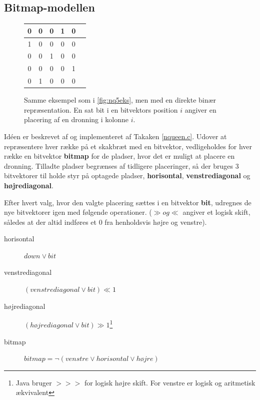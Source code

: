 \documentclass[draft,a4paper,11pt]{article}
\begin{document}

\subsection{Bitmap-modellen}\label{bitmapmodellen}

\begin{figure}[!h]
\begin{center}
\begin{tabular}{|c|c|c|c|c|c}
\hline	0 & 0 & 0 & 1 & 0 \\
\hline	1 & 0 & 0 & 0 & 0 \\
\hline	0 & 0 & 1 & 0 & 0 \\
\hline	0 & 0 & 0 & 0 & 1 \\
\hline	0 & 1 & 0 & 0 & 0 \\
\hline
\end{tabular}
\end{center}
\caption{Samme eksempel som i \ref{fig:nq5eks}, men med en direkte binær repræsentation. En sat bit i en bitvektors position $i$ angiver en placering af en dronning i kolonne $i$.}
\label{fig:nq5eksbitmap}
\end{figure}

Idéen er beskrevet af \cite{Zongyan02} og implementeret af Takaken \ref{nqueen.c}. Udover at repræsentere hver række på et skakbræt med en bitvektor, vedligeholdes for hver række  en bitvektor \textbf{bitmap} for de pladser, hvor det er muligt at placere en dronning.  Tilladte pladser begrænses af tidligere placeringer, så der bruges 3 bitvektorer til holde styr på optagede pladser, \textbf{horisontal}, \textbf{venstrediagonal}  og \textbf{højrediagonal}.

Efter hvert valg, hvor den valgte placering sættes i en bitvektor \textbf{bit}, udregnes de nye bitvektorer igen med følgende operationer. ($\gg og \ll$ angiver et logisk skift, således at der altid indføres et $0$ fra henholdsvis højre og venstre).
\begin{description}
	\item[horisontal] $down \lor bit$ 
	\item[venstrediagonal] $(venstrediagonal \lor bit) \ll 1$
	\item[højrediagonal] $(højrediagonal \lor bit) \gg  1$\footnote{Java bruger $>>>$ for logisk højre skift. For venstre er logisk og aritmetisk ækvivalent}
	\item[bitmap]	$bitmap = \lnot(venstre \lor horisontal \lor højre)$	
\end{description}
\end{document}
